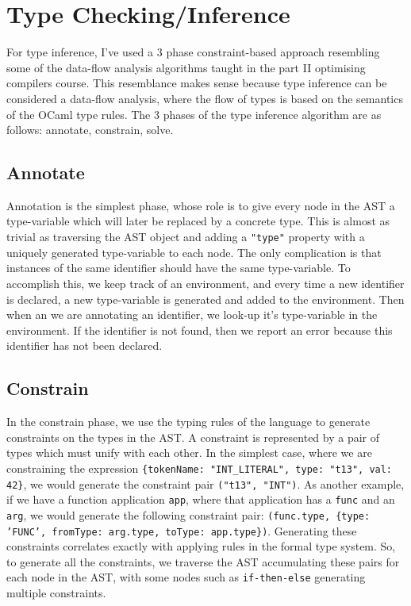 \documentclass[12pt,a4paper,twoside,openright]{report}
\begin{document}
\section{Type Checking/Inference}
For type inference, I've used a 3 phase constraint-based approach resembling some of the data-flow analysis algorithms taught in the part II optimising compilers course.
This resemblance makes sense because type inference can be considered a data-flow analysis, where the flow of types is based on the semantics of the OCaml type rules.
The 3 phases of the type inference algorithm are as follows: annotate, constrain, solve.

\subsection{Annotate}
Annotation is the simplest phase, whose role is to give every node in the AST a type-variable which will later be replaced by a concrete type.
This is almost as trivial as traversing the AST object and adding a {\tt "type"} property with a uniquely generated type-variable to each node.
The only complication is that instances of the same identifier should have the same type-variable.
To accomplish this, we keep track of an environment, and every time a new identifier is declared, a new type-variable is generated and added to the environment.
Then when an we are annotating an identifier, we look-up it's type-variable in the environment.
If the identifier is not found, then we report an error because this identifier has not been declared.
\subsection{Constrain}
In the constrain phase, we use the typing rules of the language to generate constraints on the types in the AST.
A constraint is represented by a pair of types which must unify with each other.
In the simplest case, where we are constraining the expression {\tt \{tokenName: "INT\_LITERAL", type: "t13", val: 42\}}, we would generate the constraint pair {\tt ("t13", "INT")}.
As another example, if we have a function application {\tt app}, where that application has a {\tt func} and an {\tt arg}, we would generate the following constraint pair: {\tt (func.type, \{type: 'FUNC', fromType: arg.type, toType: app.type\})}.
Generating these constraints correlates exactly with applying rules in the formal type system.
So, to generate all the constraints, we traverse the AST accumulating these pairs for each node in the AST, with some nodes such as {\tt if-then-else} generating multiple constraints.
\end{document}
